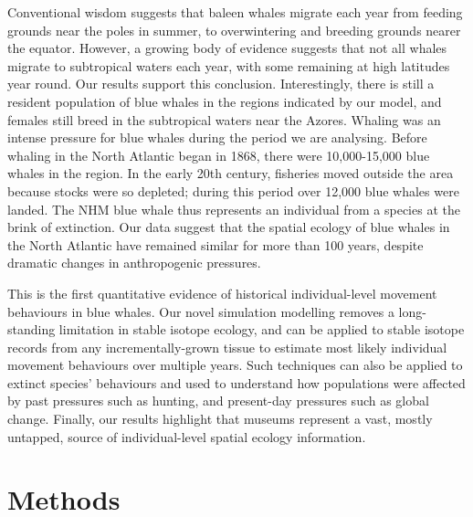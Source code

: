 \documentclass[a4paper,12pt]{article}
\begin{document}
Conventional wisdom suggests that baleen whales migrate each year from feeding grounds near the poles in summer, to overwintering and breeding grounds nearer the equator\cite{corkeron1999baleen,lockyer1981migration}. 
However, a growing body of evidence suggests that not all whales migrate to subtropical waters each year, with some remaining at high latitudes year round\cite{mcdonald2006biogeographic}. 
Our results support this conclusion. 
Interestingly, there is still a resident population of blue whales in the regions indicated by our model, and females still breed in the subtropical waters near the Azores\cite{reilly2008balaenoptera}. 
Whaling was an intense pressure for blue whales during the period we are analysing. 
Before whaling in the North Atlantic began in 1868\cite{reilly2008balaenoptera}, there were 10,000-15,000 blue whales in the region\cite{sigurjonsson1995life}. 
In the early 20th century, fisheries moved outside the area because stocks were so depleted\cite{reilly2008balaenoptera}; during this period over 12,000 blue whales were landed\cite{sigurjonsson1995life}. 
The NHM blue whale thus represents an individual from a species at the brink of extinction.
Our data suggest that the spatial ecology of blue whales in the North Atlantic have remained similar for more than 100 years, despite dramatic changes in anthropogenic pressures.

This is the first quantitative evidence of historical individual-level movement behaviours in blue whales. 
Our novel simulation modelling removes a long-standing limitation in stable isotope ecology, and can be applied to stable isotope records from any incrementally-grown tissue to estimate most likely individual movement behaviours over multiple years. 
Such techniques can also be applied to extinct species' behaviours and used to understand how populations were affected by past pressures such as hunting, and present-day pressures such as global change. 
Finally, our results highlight that museums represent a vast, mostly untapped, source of individual-level spatial ecology information.

\section{Methods}
\end{document}
